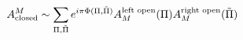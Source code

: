 \begin{equation}\begin{split}
{A}^M_{\rm closed} \sim \sum_{\Pi,\tilde \Pi}
e^{i\pi\Phi(\Pi,\tilde\Pi)}{A}_M^\text{left open}(\Pi)
{A}_M^\text{right open}(\tilde \Pi)
\end{split}\end{equation}

